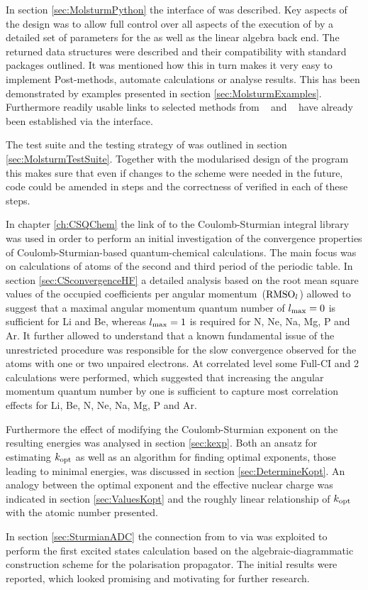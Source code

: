 In section \ref{sec:MolsturmPython}
the \python interface of \molsturm was described.
Key aspects of the design
was to allow full control over all aspects
of the execution of \molsturm by a detailed set of parameters
for the \SCF as well as the linear algebra back end.
The returned data structures were described
and their compatibility with standard \python packages outlined.
It was mentioned how this in turn
makes it very easy to implement Post-\HF methods,
automate calculations or analyse results.
This has been demonstrated by examples
presented in section \ref{sec:MolsturmExamples}.
Furthermore
readily usable links to selected methods
from \pyscf~\cite{Sun2017} and \adcman~\cite{Wormit2014}
have already been established via the
\python interface.

The test suite and the testing strategy
of \molsturm was outlined in section \ref{sec:MolsturmTestSuite}.
Together with the modularised design of the program
this makes sure that even if changes to the \SCF scheme
were needed in the future,
code could be amended in steps
and the correctness of \molsturm verified in each of these steps.


In chapter \ref{ch:CSQChem} the link of \molsturm
to the Coulomb-Sturmian integral library \sturmint was used
in order to perform an initial investigation
of the convergence properties of Coulomb-Sturmian-based
quantum-chemical calculations.
The main focus was on \HF calculations of atoms
of the second and third period of the periodic table.
In section \ref{sec:CSconvergenceHF}
a detailed analysis based on the root mean square values
of the occupied coefficients per angular momentum~($\text{RMSO}_l$)
allowed to suggest that
a maximal angular momentum quantum number of $l_\text{max} = 0$
is sufficient for Li and Be,
whereas $l_\text{max} = 1$ is required for N, Ne, Na, Mg, P and Ar.
It further allowed to understand that a known fundamental issue of
the unrestricted \HF procedure
was responsible for the slow convergence observed for the
atoms with one or two unpaired electrons.
At correlated level some Full-CI and {\MP}2 calculations
were performed,
which suggested that increasing the angular momentum quantum number
by one is sufficient to capture
most correlation effects for Li, Be, N, Ne, Na, Mg, P and Ar.

Furthermore the effect of modifying the Coulomb-Sturmian
exponent on the resulting \HF energies was analysed in section \ref{sec:kexp}.
Both an ansatz for estimating $k_\text{opt}$ as well as
an algorithm for finding optimal exponents,
\ie those leading to minimal energies,
was discussed in section \ref{sec:DetermineKopt}.
An analogy between the optimal exponent and
the effective nuclear charge was indicated in section \ref{sec:ValuesKopt}
and the roughly
linear relationship of $k_\text{opt}$ with the atomic number presented.

In section \ref{sec:SturmianADC} the connection from
\molsturm to \adcman via \python
was exploited to perform the first
excited states calculation based on the algebraic-diagrammatic construction
scheme for the polarisation propagator.
The initial results were reported,
which looked promising and motivating for further research.
